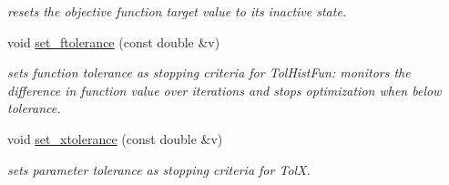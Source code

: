 \begin{DoxyCompactItemize}
\begin{DoxyCompactList}\small\item\em resets the objective function target value to its inactive state. \end{DoxyCompactList}\item 
void \hyperlink{classlibcmaes_1_1Parameters_ad01dddcc81b121f20afeaafc09537304}{set\-\_\-ftolerance} (const double \&v)
\begin{DoxyCompactList}\small\item\em sets function tolerance as stopping criteria for Tol\-Hist\-Fun\-: monitors the difference in function value over iterations and stops optimization when below tolerance. \end{DoxyCompactList}\item 
void \hyperlink{classlibcmaes_1_1Parameters_aa131adbd299a29259034cac7cfe83009}{set\-\_\-xtolerance} (const double \&v)
\begin{DoxyCompactList}\small\item\em sets parameter tolerance as stopping criteria for Tol\-X. \end{DoxyCompactList}\end{DoxyCompactItemize}
